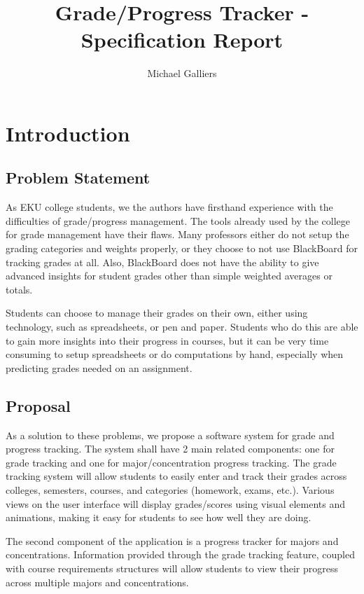 \documentclass[12pt]{article}
\author{Michael Galliers}
\title{Grade/Progress Tracker - Specification Report}
\begin{document}
\begin{titlepage}
\maketitle
\end{titlepage}

\newpage
    \tableofcontents
\newpage

\thispagestyle{empty}
\listoffigures
\newpage

\section{Introduction}
\subsection{Problem Statement}
As EKU college students, we the authors have firsthand experience with the difficulties of
grade/progress management. The tools already used by the college for grade management have their
flaws. Many professors either do not setup the grading categories and weights properly, or they
choose to not use BlackBoard for tracking grades at all. Also, BlackBoard does not have the ability
to give advanced insights for student grades other than simple weighted averages or totals.

Students can choose to manage their grades on their own, either using technology, such as
spreadsheets, or pen and paper. Students who do this are able to gain more insights into their
progress in courses, but it can be very time consuming to setup spreadsheets or do computations by
hand, especially when predicting grades needed on an assignment.

\subsection{Proposal}
As a solution to these problems, we propose a software system for grade and progress tracking. The
system shall have 2 main related components: one for grade tracking and one for major/concentration
progress tracking. The grade tracking system will allow students to easily enter and track their
grades across colleges, semesters, courses, and categories (homework, exams, etc.). Various views on
the user interface will display grades/scores using visual elements and animations, making it easy
for students to see how well they are doing.

The second component of the application is a progress tracker for majors and concentrations.
Information provided through the grade tracking feature, coupled with course requirements structures
will allow students to view their progress across multiple majors and concentrations.
\end{document}
